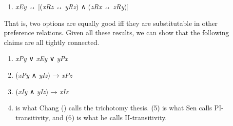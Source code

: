 \documentclass[
  11pt,
  letterpaper,
  DIV=11,
  numbers=noendperiod,
  twoside]{scrartcl}
\providecommand{\tightlist}{%
  \setlength{\itemsep}{0pt}\setlength{\parskip}{0pt}}
\begin{document}
\begin{enumerate}
\def\labelenumi{(\arabic{enumi})}
\setcounter{enumi}{2}
\tightlist
\item
  \emph{xEy} ↔︎ {[}(\emph{xRz} ↔︎ \emph{yRz}) ∧ (\emph{zRx} ↔︎
  \emph{zRy}){]}
\end{enumerate}

That is, two options are equally good iff they are substitutable in
other preference relations. Given all these results, we can show that
the following claims are all tightly connected.

\begin{enumerate}
\def\labelenumi{(\arabic{enumi})}
\setcounter{enumi}{3}
\item
  \emph{xPy} ∨ \emph{xEy} ∨ \emph{yPx}
\item
  (\emph{xPy} ∧ \emph{yIz}) → \emph{xPz}
\item
  (\emph{xIy} ∧ \emph{yIz}) → \emph{xIz}
\item
  is what Chang () calls the trichotomy
  thesis. (5) is what Sen calls PI-transitivity, and (6) is what he
  calls II-transitivity.
\end{enumerate}
\end{document}
